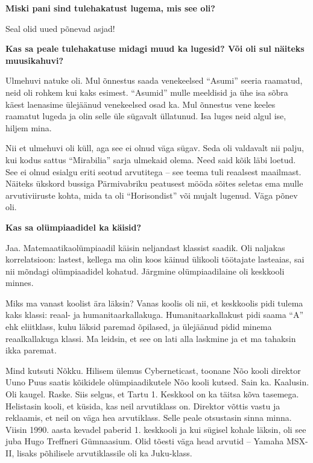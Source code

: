 \textbf{Miski pani sind tulehakatust lugema, mis see oli?}

Seal olid uued põnevad asjad!

\textbf{Kas sa peale tulehakatuse midagi muud ka lugesid? Või oli sul
näiteks muusikahuvi?}

Ulmehuvi natuke oli. Mul õnnestus saada venekeelsed \enquote{Asumi} seeria raamatud, neid
oli rohkem kui kaks esimest. \enquote{Asumid} mulle meeldisid ja ühe isa sõbra käest
laenasime ülejäänud venekeelsed osad ka. Mul õnnestus vene keeles
raamatut lugeda ja olin selle üle sügavalt üllatunud. Isa luges neid algul
ise, hiljem mina. 

Nii et ulmehuvi oli küll, aga see ei olnud väga sügav. Seda
oli valdavalt nii palju, kui kodus sattus \enquote{Mirabilia} sarja ulmekaid olema. Need
said kõik läbi loetud. See ei olnud esialgu eriti seotud arvutitega -- see teema tuli reaalsest maailmast. Näiteks ükskord
bussiga Pärmivabriku peatusest mööda sõites seletas ema mulle arvutiviiruste
kohta, mida ta oli \enquote{Horisondist} või mujalt lugenud.
Väga põnev oli. 

\textbf{Kas sa olümpiaadidel ka käisid?}

Jaa. Matemaatikaolümpiaadil käisin neljandast klassist saadik. Oli
naljakas korrelatsioon: lastest, kellega ma olin koos käinud ülikooli töötajate
lasteaias, sai nii mõndagi olümpiaadidel kohatud. Järgmine
olümpiaadilaine oli keskkooli minnes.

Miks ma vanast koolist ära läksin? Vanas koolis oli nii, et keskkoolis pidi
tulema kaks klassi: reaal- ja humanitaarkallakuga. 
Humanitaarkallakust pidi saama \enquote{A} ehk eliitklass, kuhu läksid paremad
õpilased, ja ülejäänud pidid minema reaalkallakuga klassi. Ma
leidsin, et see on lati alla laskmine ja et ma tahaksin ikka paremat. 

Mind kutsuti Nõkku. Hilisem ülemus
Cyberneticast, toonane Nõo kooli direktor Uuno
Puus saatis kõikidele olümpiaadikutele Nõo kooli
kutsed. Sain ka. Kaalusin. Oli kaugel. Raske. Siis selgus, et Tartu 1. Keskkool on ka täitsa kõva tasemega. Helistasin
kooli, et küsida, kas neil arvutiklass on. Direktor võttis vastu ja
reklaamis, et neil on väga hea arvutiklass. Selle peale otsustasin sinna
minna. Viisin 1990. aasta kevadel paberid 1. keskkooli ja kui sügisel
kohale läksin, oli see juba Hugo Treffneri Gümnaasium. Olid tõesti väga head arvutid
-- Yamaha MSX-II, lisaks põhilisele arvutiklassile oli ka
Juku-klass.

